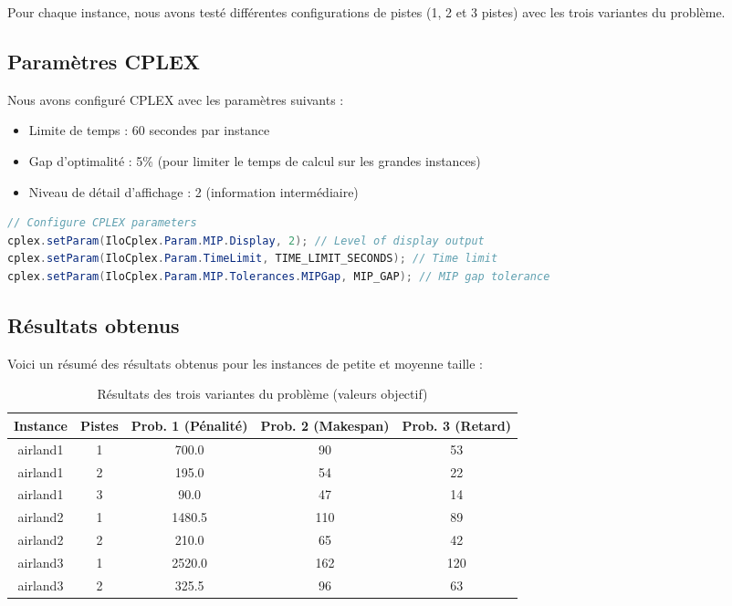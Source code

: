 \documentclass[a4paper,12pt]{report}
\begin{document}
Pour chaque instance, nous avons testé différentes configurations de pistes (1, 2 et 3 pistes) avec les trois variantes du problème.

\subsection{Paramètres CPLEX}
Nous avons configuré CPLEX avec les paramètres suivants :
\begin{itemize}
  \item Limite de temps : 60 secondes par instance
  \item Gap d'optimalité : 5\% (pour limiter le temps de calcul sur les grandes instances)
  \item Niveau de détail d'affichage : 2 (information intermédiaire)
\end{itemize}

\begin{lstlisting}[language=Java, caption=Configuration des paramètres CPLEX]
// Configure CPLEX parameters
cplex.setParam(IloCplex.Param.MIP.Display, 2); // Level of display output
cplex.setParam(IloCplex.Param.TimeLimit, TIME_LIMIT_SECONDS); // Time limit
cplex.setParam(IloCplex.Param.MIP.Tolerances.MIPGap, MIP_GAP); // MIP gap tolerance
\end{lstlisting}

\subsection{Résultats obtenus}
Voici un résumé des résultats obtenus pour les instances de petite et moyenne taille :

\begin{table}[H]
  \centering
  \begin{tabular}{ccccc}
    \toprule
    \textbf{Instance} & \textbf{Pistes} & \textbf{Prob. 1 (Pénalité)} & \textbf{Prob. 2 (Makespan)} & \textbf{Prob. 3 (Retard)} \\
    \midrule
    airland1 & 1 & 700.0 & 90 & 53 \\
    airland1 & 2 & 195.0 & 54 & 22 \\
    airland1 & 3 & 90.0 & 47 & 14 \\
    airland2 & 1 & 1480.5 & 110 & 89 \\
    airland2 & 2 & 210.0 & 65 & 42 \\
    airland3 & 1 & 2520.0 & 162 & 120 \\
    airland3 & 2 & 325.5 & 96 & 63 \\
    \bottomrule
  \end{tabular}
  \caption{Résultats des trois variantes du problème (valeurs objectif)}
  \label{tab:results}
\end{table}
\end{document}
